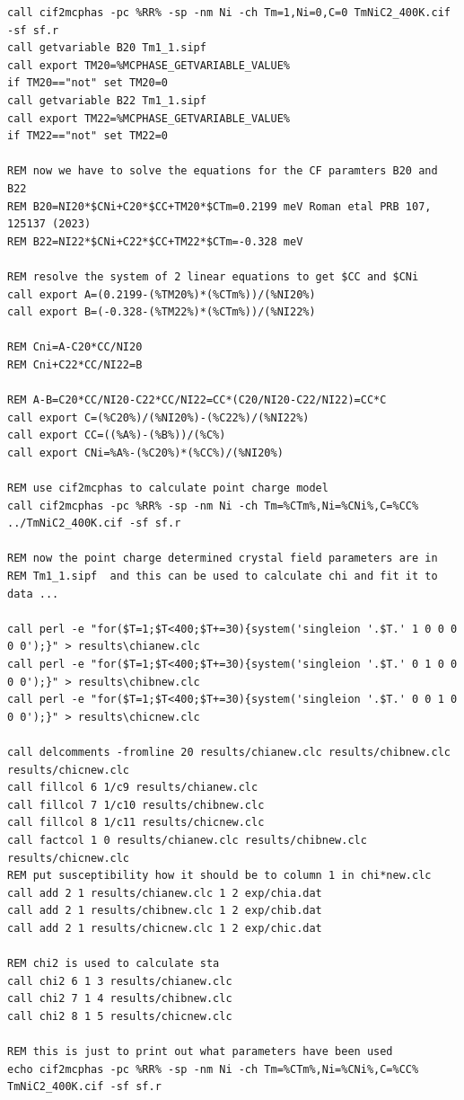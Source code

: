 \begin{verbatim}
call cif2mcphas -pc %RR% -sp -nm Ni -ch Tm=1,Ni=0,C=0 TmNiC2_400K.cif -sf sf.r
call getvariable B20 Tm1_1.sipf
call export TM20=%MCPHASE_GETVARIABLE_VALUE%
if TM20=="not" set TM20=0
call getvariable B22 Tm1_1.sipf
call export TM22=%MCPHASE_GETVARIABLE_VALUE%
if TM22=="not" set TM22=0

REM now we have to solve the equations for the CF paramters B20 and B22
REM B20=NI20*$CNi+C20*$CC+TM20*$CTm=0.2199 meV Roman etal PRB 107, 125137 (2023) 
REM B22=NI22*$CNi+C22*$CC+TM22*$CTm=-0.328 meV

REM resolve the system of 2 linear equations to get $CC and $CNi 
call export A=(0.2199-(%TM20%)*(%CTm%))/(%NI20%)
call export B=(-0.328-(%TM22%)*(%CTm%))/(%NI22%)

REM Cni=A-C20*CC/NI20
REM Cni+C22*CC/NI22=B

REM A-B=C20*CC/NI20-C22*CC/NI22=CC*(C20/NI20-C22/NI22)=CC*C
call export C=(%C20%)/(%NI20%)-(%C22%)/(%NI22%)
call export CC=((%A%)-(%B%))/(%C%)
call export CNi=%A%-(%C20%)*(%CC%)/(%NI20%)

REM use cif2mcphas to calculate point charge model
call cif2mcphas -pc %RR% -sp -nm Ni -ch Tm=%CTm%,Ni=%CNi%,C=%CC% ../TmNiC2_400K.cif -sf sf.r

REM now the point charge determined crystal field parameters are in
REM Tm1_1.sipf  and this can be used to calculate chi and fit it to data ...

call perl -e "for($T=1;$T<400;$T+=30){system('singleion '.$T.' 1 0 0 0 0 0');}" > results\chianew.clc
call perl -e "for($T=1;$T<400;$T+=30){system('singleion '.$T.' 0 1 0 0 0 0');}" > results\chibnew.clc
call perl -e "for($T=1;$T<400;$T+=30){system('singleion '.$T.' 0 0 1 0 0 0');}" > results\chicnew.clc

call delcomments -fromline 20 results/chianew.clc results/chibnew.clc results/chicnew.clc 
call fillcol 6 1/c9 results/chianew.clc
call fillcol 7 1/c10 results/chibnew.clc
call fillcol 8 1/c11 results/chicnew.clc
call factcol 1 0 results/chianew.clc results/chibnew.clc results/chicnew.clc
REM put susceptibility how it should be to column 1 in chi*new.clc
call add 2 1 results/chianew.clc 1 2 exp/chia.dat
call add 2 1 results/chibnew.clc 1 2 exp/chib.dat
call add 2 1 results/chicnew.clc 1 2 exp/chic.dat

REM chi2 is used to calculate sta 
call chi2 6 1 3 results/chianew.clc
call chi2 7 1 4 results/chibnew.clc
call chi2 8 1 5 results/chicnew.clc

REM this is just to print out what parameters have been used
echo cif2mcphas -pc %RR% -sp -nm Ni -ch Tm=%CTm%,Ni=%CNi%,C=%CC% TmNiC2_400K.cif -sf sf.r

\end{verbatim}



